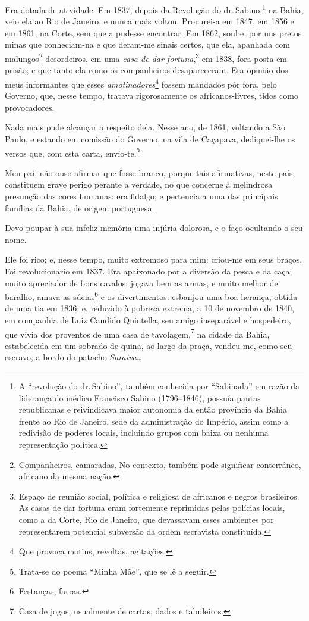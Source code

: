Era dotada de atividade. Em 1837, depois da Revolução do dr.\,Sabino,\footnote{A ``revolução do dr.\,Sabino'', também conhecida por \label{sabinada}
  ``Sabinada'' em razão da liderança do médico Francisco Sabino
  (1796--1846), possuía pautas republicanas e reivindicava maior
  autonomia da então província da Bahia frente ao Rio de Janeiro, sede
  da administração do Império, assim como a redivisão de poderes locais,
  incluindo grupos com baixa ou nenhuma representação política.} na
Bahia, veio ela ao Rio de Janeiro, e nunca mais voltou. Procurei-a em
1847, em 1856 e em 1861, na Corte, sem que a pudesse encontrar. Em 1862,
soube, por uns pretos minas que conheciam-na e que deram-me sinais
certos, que ela, apanhada com malungos\footnote{Companheiros,
  camaradas. No contexto, também pode significar conterrâneo, africano
  da mesma nação.} desordeiros, em uma \emph{casa de dar
fortuna},\footnote{Espaço de reunião social, política e religiosa de \label{fortuna}
  africanos e negros brasileiros. As casas de dar fortuna eram
  fortemente reprimidas pelas polícias locais, como a da Corte, Rio de
  Janeiro, que devassavam esses ambientes por representarem potencial
  subversão da ordem escravista constituída.} em 1838, fora posta em
prisão; e que tanto ela como os companheiros desapareceram. Era opinião
dos meus informantes que esses \emph{amotinadores}\footnote{Que
  provoca motins, revoltas, agitações.} fossem mandados pôr fora, pelo
Governo, que, nesse tempo, tratava rigorosamente os africanos-livres,
tidos como provocadores.

Nada mais pude alcançar a respeito dela. Nesse ano, de 1861, voltando a
São Paulo, e estando em comissão do Governo, na vila de Caçapava,
dediquei-lhe os versos que, com esta carta, envio-te.\footnote{Trata-se
  do poema ``Minha Mãe'', que se lê a seguir.}

Meu pai, não ouso afirmar que fosse branco, porque tais afirmativas,
neste país, constituem grave perigo perante a verdade, no que concerne à
melindrosa presunção das cores humanas: era fidalgo; e pertencia a uma
das principais famílias da Bahia, de origem portuguesa.

Devo poupar à sua infeliz memória uma injúria dolorosa, e o faço
ocultando o seu nome.

Ele foi rico; e, nesse tempo, muito extremoso para mim: criou-me em seus
braços. Foi revolucionário em 1837. Era apaixonado por a diversão da
pesca e da caça; muito apreciador de bons cavalos; jogava bem as armas,
e muito melhor de baralho, amava as súcias\footnote{Festanças, farras.}
e os divertimentos: esbanjou uma boa herança, obtida de uma tia em 1836;
e, reduzido à pobreza extrema, a 10 de novembro de 1840, em companhia de
Luiz Candido Quintella, seu amigo inseparável e hospedeiro, que vivia
dos proventos de uma casa de tavolagem,\footnote{Casa de jogos,
  usualmente de cartas, dados e tabuleiros.} na cidade da Bahia,
estabelecida em um sobrado de quina, ao largo da praça, vendeu-me, como
seu escravo, a bordo do patacho \emph{Saraiva}\ldots{}

